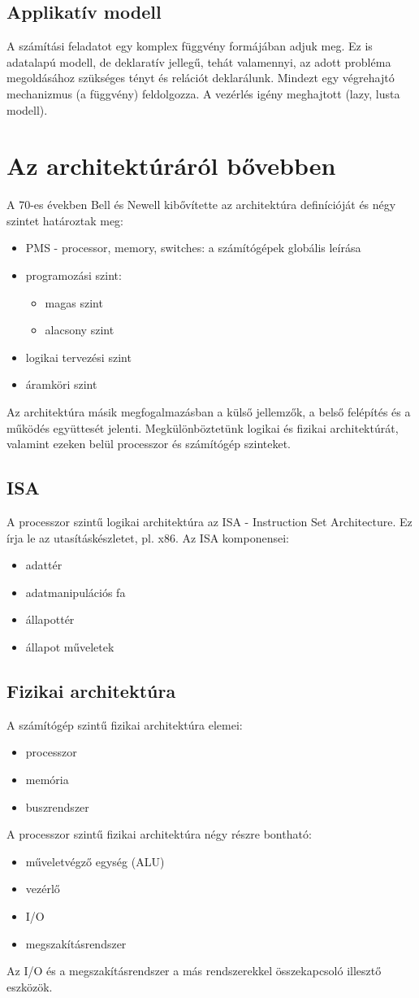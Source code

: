 \subsection{Applikatív modell}
A számítási feladatot egy komplex függvény formájában adjuk meg.
Ez is adatalapú modell, de deklaratív jellegű, tehát valamennyi, az adott probléma megoldásához szükséges tényt és relációt deklarálunk.
Mindezt egy végrehajtó mechanizmus (a függvény) feldolgozza.
A vezérlés igény meghajtott (lazy, lusta modell).

\section{Az architektúráról bővebben}
A 70-es években Bell és Newell kibővítette az architektúra definícióját és négy szintet határoztak meg:
\begin{itemize}
    \item PMS - processor, memory, switches: a számítógépek globális leírása
    \item programozási szint:
    \begin{itemize}
        \item magas szint
        \item alacsony szint
    \end{itemize}
    \item logikai tervezési szint
    \item áramköri szint
\end{itemize}

Az architektúra másik megfogalmazásban a külső jellemzők, a belső felépítés és a működés együttesét jelenti.
Megkülönböztetünk logikai és fizikai architektúrát, valamint ezeken belül processzor és számítógép szinteket.

\subsection{ISA}
A processzor szintű logikai architektúra az ISA - Instruction Set Architecture.
Ez írja le az utasításkészletet, pl. x86.
Az ISA komponensei:
\begin{itemize}
    \item adattér
    \item adatmanipulációs fa
    \item állapottér
    \item állapot műveletek
\end{itemize}

\subsection{Fizikai architektúra}
A számítógép szintű fizikai architektúra elemei:
\begin{itemize}
    \item processzor
    \item memória
    \item buszrendszer
\end{itemize}

A processzor szintű fizikai architektúra négy részre bontható:
\begin{itemize}
    \item műveletvégző egység (ALU)
    \item vezérlő
    \item I/O
    \item megszakításrendszer
\end{itemize}
Az I/O és a megszakításrendszer a más rendszerekkel összekapcsoló illesztő eszközök.